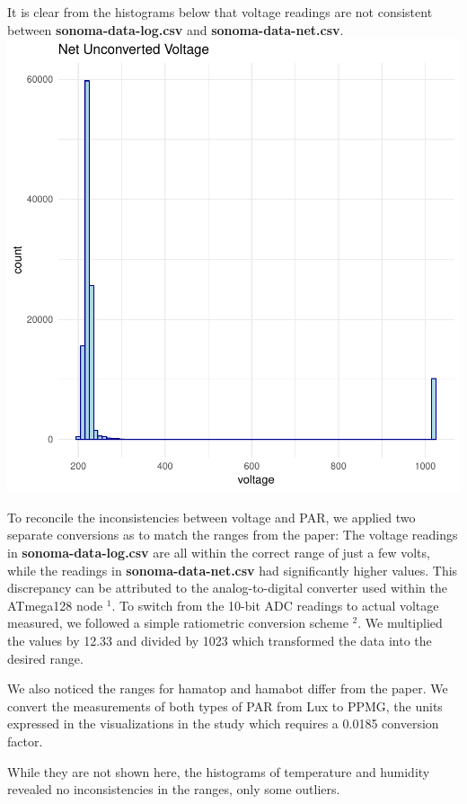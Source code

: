 \documentclass[11pt]{article}
\begin{document}
\begin{enumerate}[label=(\alph*)]
It is clear from the histograms below that voltage readings are not consistent between \textbf{sonoma-data-log.csv} and \textbf{sonoma-data-net.csv}.
\includegraphics{project1writeup-004}

To reconcile the inconsistencies between voltage and PAR, we applied two separate conversions as to match the ranges from the paper: \newline
The voltage readings in \textbf{sonoma-data-log.csv} are all within the correct range of just a few volts, while the readings in \textbf{sonoma-data-net.csv} had significantly higher values. This discrepancy can be attributed to the analog-to-digital converter used within the ATmega128 node $^1$. To switch from the 10-bit ADC readings to actual voltage measured, we followed a simple ratiometric conversion scheme $^2$. We multiplied the values by 12.33 and divided by 1023 which transformed the data into the desired range.

We also noticed the ranges for hamatop and hamabot differ from the paper. We convert the measurements of both types of PAR from Lux to PPMG, the units expressed in the visualizations in the study which requires a 0.0185 conversion factor.


While they are not shown here, the histograms of temperature and humidity revealed no inconsistencies in the ranges, only some outliers.


\end{enumerate}
\end{document}
